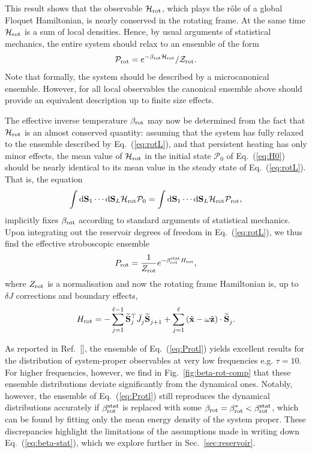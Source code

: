 \documentclass[aps,pre,twocolumn,notitlepage,floats,10pt]{revtex4-1}
\def\d{\mathrm{d}}
\def\ptop{{\vphantom\top}}
\newcommand{\be}{\begin{equation}}
\newcommand{\ee}{\end{equation}}
\begin{document}
This result shows that the observable $\mathcal{H}_{\rm rot}$, which plays the
r\^{o}le of a global Floquet Hamiltonian, is nearly conserved in the rotating
frame. At the same time $\mathcal{H}_{\rm rot}$ is a sum of local densities.
Hence, by usual arguments of statistical mechanics, the entire system should
relax to an ensemble of the form
\be
\mathcal{P}_{\rm rot} = e^{-\beta_{\rm rot} \mathcal{H}_{\rm
      rot}}/\mathcal{Z}_{\rm rot}. \label{eq:rotL}
\ee
Note that formally, the system should be described by a microcanonical
ensemble.
However, for all local observables the canonical ensemble above should provide
an equivalent description up to finite size effects.

The effective inverse temperature $\beta_{\rm rot}$ may now be determined from
the fact that $\mathcal{H}_{\rm rot}$ is an almost conserved quantity:
assuming that the system has fully relaxed to the ensemble described by
Eq.~(\ref{eq:rotL}), and that persistent heating has only minor effects, the
mean value of $\mathcal{H}_{\rm rot}$ in the initial state $\mathcal{P}_0$ of
Eq.~(\ref{eq:H0}) should be nearly identical to its mean value in the steady
state of Eq.~(\ref{eq:rotL}).
That is, the equation
\be
\int \d{\bf S}_1 \cdots \d{\bf S}_L \mathcal{H}_{\rm rot} \mathcal{P}_0
=
\int \d{\bf S}_1 \cdots \d{\bf S}_L \mathcal{H}_{\rm rot} \mathcal{P}_{\rm rot}
,
\label{eq:beta-stat}
\ee
implicitly fixes $\beta_{\rm rot}$ according to standard arguments of
statistical mechanics.
Upon integrating out the reservoir degrees of freedom in Eq.~(\ref{eq:rotL}),
we thus find the effective stroboscopic ensemble
\be
P_{\rm rot} = \frac{1}{Z_{\rm rot}} e^{-\beta_{\rm rot}^{\rm stat} H_{\rm rot}},
\label{eq:Protl}
\ee
where $Z_{\rm rot}$ is a normalisation and now the rotating frame Hamiltonian
is, up to $\delta J$ corrections and boundary effects,
\be
H_{\rm rot}
=
-\sum_{j=1}^{\ell - 1} \widetilde{\bf S}_j^\top \bar{J}_j^\ptop \widetilde{\bf S}_{j+1}^\ptop
+ \sum_{j=1}^\ell \left( \hat{\bf x} - \omega \hat{\bf z}\right) \cdot
\widetilde{\bf S}_j^\ptop
.
\label{eq:Hrotl}
\ee

As reported in Ref.~[], the ensemble of
Eq.~(\ref{eq:Protl}) yields excellent results for the distribution of
system-proper observables at very low frequencies e.g. $\tau = 10$.
For higher frequencies, however, we find in Fig.~\ref{fig:beta-rot-comp} that
these ensemble distributions deviate significantly from  the dynamical ones.
Notably, however, the ensemble of Eq.~(\ref{eq:Protl}) still reproduces the
dynamical distributions accurately if $\beta_{\rm rot}^{\rm stat}$ is replaced
with some $\beta_{\rm rot} = \beta_{\rm rot}^* < \beta_{\rm rot}^{\rm stat}$,
which can be found by fitting only the mean energy density of the system
proper.
These discrepancies highlight the limitations of the assumptions made in
writing down Eq.~(\ref{eq:beta-stat}), which we explore further in
Sec.~\ref{sec:reservoir}.
\end{document}
